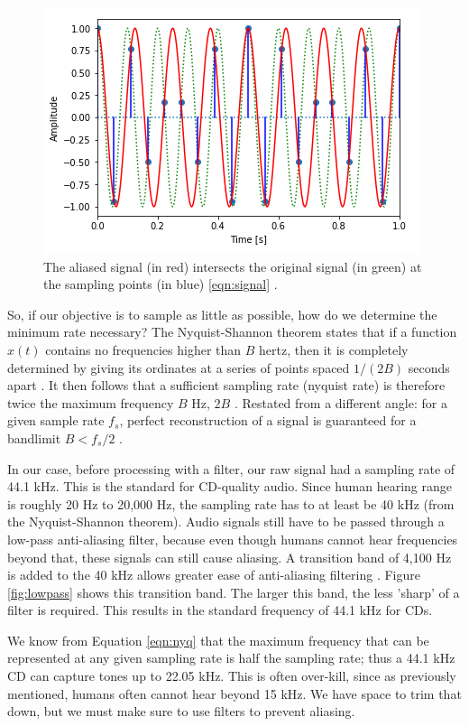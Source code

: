 \begin{figure}[H]
	\centering
	\includegraphics[scale = 1]{images/aliased_curve.png} %
	
 \caption{
	The aliased signal (in red) intersects the original
 	signal (in green) at the sampling points (in blue)
	\ref{eqn:signal} \cite{notebook:sampling}.
	} 
 	\label{fig:aliase}  
 \end{figure}

So, if our objective is to sample as little as possible, how do
we determine the minimum rate necessary? The Nyquist-Shannon theorem states that if a function $x ( t )$ contains no
frequencies higher than $B$ hertz, then it is completely determined by
giving its ordinates at a series of points spaced $1 / ( 2 B )$
seconds apart \cite{shannon:wiki}. It then follows that a sufficient sampling rate (nyquist rate) is therefore twice the maximum frequency $B$ Hz, $2B$ \cite{shannon:wiki}.
Restated from a different angle: for a given sample rate $f_{s}$, perfect reconstruction of a signal is guaranteed for a bandlimit $B<f_{s}/2$ \cite{shannon:wiki}.


In our case, before processing with a filter, our raw signal had
a sampling rate of 44.1 kHz. This is the standard for CD-quality
audio. Since human hearing range is roughly 20 Hz to 20,000 Hz, the sampling rate has to at least be 40 kHz (from the Nyquist-Shannon theorem). Audio signals still have to be passed through a low-pass anti-aliasing filter, because even though humans cannot hear frequencies beyond that, these signals can still cause aliasing. A transition band of 4,100 Hz is added to the 40 kHz allows greater ease of anti-aliasing filtering \cite{cd:wiki}. Figure \ref{fig:lowpass} shows this transition band.  The larger this band, the less 'sharp' of a filter is required. This results in the standard frequency of 44.1 kHz for CDs.



We know from Equation \ref{eqn:nyq} that the maximum
frequency that can be represented at any given sampling rate is
half the sampling rate; thus a 44.1 kHz CD can capture tones up
to 22.05 kHz. This is often over-kill, since as previously
mentioned, humans often cannot hear beyond 15 kHz. We have space
to trim that down, but we must make sure to use filters to
prevent aliasing.
